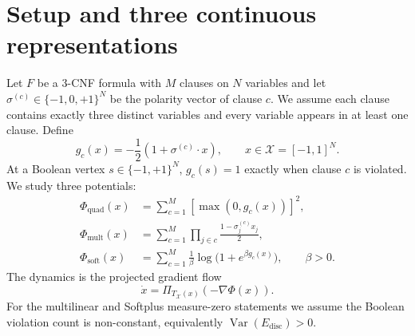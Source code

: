 \documentclass[11pt,a4paper]{article}
\begin{document}
\section{Setup and three continuous representations}
Let $F$ be a 3-CNF formula with $M$ clauses on $N$ variables and let $\sigma^{(c)}\in\{-1,0,+1\}^N$ be the polarity vector of clause $c$. We assume each clause contains exactly three distinct variables and every variable appears in at least one clause. Define
\begin{equation}
g_c(x)=-\frac12\left(1+\sigma^{(c)}\cdot x\right),\qquad x\in\mathcal X=[-1,1]^N.
\end{equation}
At a Boolean vertex $s\in\{-1,+1\}^N$, $g_c(s)=1$ exactly when clause $c$ is violated. We study three potentials:
\begin{align}
\Phi_{\mathrm{quad}}(x)&=\sum_{c=1}^M[\max(0,g_c(x))]^2,\\
\Phi_{\mathrm{mult}}(x)&=\sum_{c=1}^M\prod_{j\in c}\frac{1-\sigma_j^{(c)}x_j}{2},\\
\Phi_{\mathrm{soft}}(x)&=\sum_{c=1}^M\frac1\beta\log\bigl(1+e^{\beta g_c(x)}\bigr),\qquad \beta>0.
\end{align}
The dynamics is the projected gradient flow
\begin{equation}\dot x=\Pi_{T_{\mathcal X}(x)}(-\nabla\Phi(x)).\end{equation}
For the multilinear and Softplus measure-zero statements we assume the Boolean violation count is non-constant, equivalently $\operatorname{Var}(E_{\mathrm{disc}})>0$.
\end{document}
